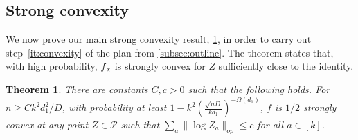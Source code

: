 \documentclass[aos]{imsart}
\newtheorem{theorem}{Theorem}
\theoremstyle{definition}
\newcommand{\PD}{\operatorname{P}}
\newcommand{\SPD}{\mathcal{P}}
\newcommand{\samp}{x}
\newcommand{\rv}{X}
\newcommand{\CF}[1]{{\color{purple}[CF: #1]}}
\begin{document}







\subsection{Strong convexity}
We now prove our main strong convexity result, \cref{thm:ball-convexity}, in order to carry out step~\cref{it:convexity} of the plan from \cref{subsec:outline}. The theorem states that, with high probability, $f_X$ is strongly convex for $Z$ sufficiently close to the identity.



\begin{theorem}\label{thm:ball-convexity} There are constants $C,c>0$ such that the following holds. For $n \geq C k^2 d_1^2/D$, with probability at least $1 - k^2 \left(\frac {\sqrt{nD}}{kd_1}\right)^{ - \Omega(d_1)}$, $f$ is $1/2$ strongly convex at any point $Z \in \SPD$ such that $\sum_a \|\log Z_a\|_{op} \leq c$ for all $a \in [k]$.
\end{theorem}


\end{document}
